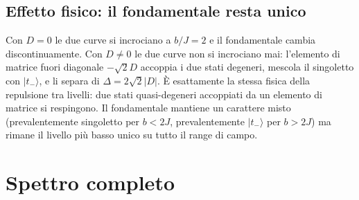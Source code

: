 \documentclass[11pt,a4paper]{article}
\newcommand{\ket}[1]{\lvert #1 \rangle}
\theoremstyle{definition}
\begin{document}
\subsection{Effetto fisico: il fondamentale resta unico}

Con $D=0$ le due curve si incrociano a $b/J=2$ e il fondamentale cambia discontinuamente. Con
$D\neq0$ le due curve non si incrociano mai: l'elemento di matrice fuori diagonale $-\sqrt2 D$
accoppia i due stati degeneri, mescola il singoletto con $\ket{t_-}$, e li separa di $\Delta=2\sqrt2|D|$.
È esattamente la stessa fisica della repulsione tra livelli: due stati quasi-degeneri accoppiati da un
elemento di matrice si respingono. Il fondamentale mantiene un carattere misto (prevalentemente
singoletto per $b<2J$, prevalentemente $\ket{t_-}$ per $b>2J$) ma rimane il livello più basso unico
su tutto il range di campo.

\FloatBarrier
\section{Spettro completo}
\end{document}
